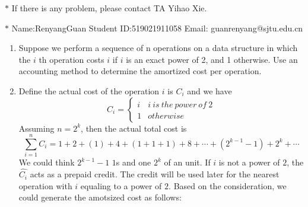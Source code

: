 \documentclass[12pt,a4paper]{article}
\makeatletter
\newtheorem*{solution}{Solution}
\theoremstyle{definition}
\renewenvironment{solution}[1][Solution] {\par\pushQED{\qed}\normalfont\topsep6\p@\@plus6\p@\relax\trivlist\item[\hskip\labelsep\bfseries#1\@addpunct{.}]\ignorespaces}{\popQED\endtrivlist\@endpefalse} \makeatother
\makeatother
\begin{document}
\noindent

\noindent{}
\begin{center}
\footnotesize{\color{red}$*$ If there is any problem, please contact TA Yihao Xie. }

\footnotesize{\color{blue}$*$ Name:RenyangGuan  \quad Student ID:519021911058 \quad Email: guanrenyang@sjtu.edu.cn}
\end{center}
\begin{enumerate}
	\item Suppose we perform a sequence of n operations on a data structure in which the $i$ th 		operation costs $i$ if $i$ is an exact power of 2, and 1 otherwise. Use an accounting method to determine the amortized cost per operation.
    \begin{solution}
    Define the actual cost of the operation $i$ is $C_i$ and we have
    \begin{equation}
        C_i=
        \begin{cases}
        i & i\ is \ the \ power \ of \ 2\\
        1 & otherwise
        \end{cases}
    \end{equation}
    Assuming $n=2^k$, then the actual total cost is 
	\begin{equation}
	        \sum_{i=1}^n C_i=1+2+(1)+4+(1+1+1)+8+\cdots +(2^{k-1}-1)+2^k+\cdots
	\end{equation}
	We could think $2^{k-1} -1$ $1$s and one $2^k$ of an unit. If $i$ is not a power of $2$, the $\hat{C_i}$ acts as a prepaid credit. The credit will be used later for the nearest operation with $i$ equaling to a power of $2$.
	Based on the consideration, we could generate the amotsized cost as follows:
	

\end{solution}
\end{enumerate}
\end{document}
